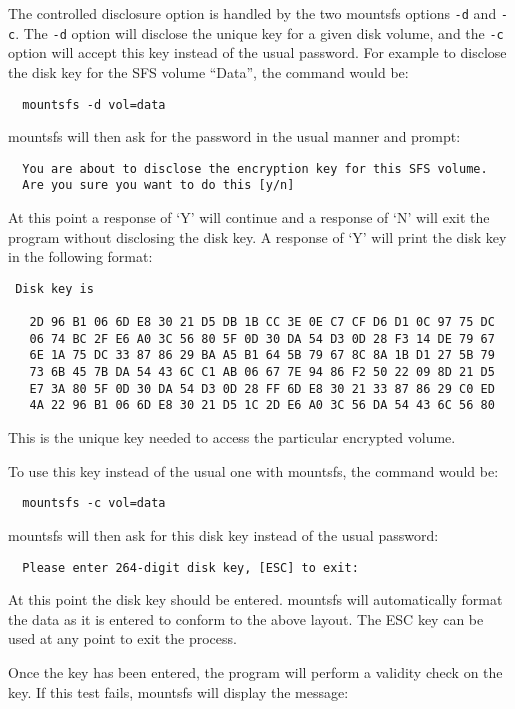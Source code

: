 The controlled disclosure option is handled by the two mountsfs options {\tt -d}
and {\tt -c}.  The {\tt -d} option will disclose the unique key for a given disk
volume, and the {\tt -c} option will accept this key instead of the usual password.
For example to disclose the disk key for the SFS volume ``Data'', the command
would be:

{\tt \verb|  |mountsfs -d vol=data}

mountsfs will then ask for the password in the usual manner and prompt:

\begin{verbatim}
  You are about to disclose the encryption key for this SFS volume.
  Are you sure you want to do this [y/n]
\end{verbatim}

At this point a response of `Y' will continue and a response of `N' will exit
the program without disclosing the disk key.  A response of `Y' will print the
disk key in the following format:

\begin{verbatim}
 Disk key is

   2D 96 B1 06 6D E8 30 21 D5 DB 1B CC 3E 0E C7 CF D6 D1 0C 97 75 DC
   06 74 BC 2F E6 A0 3C 56 80 5F 0D 30 DA 54 D3 0D 28 F3 14 DE 79 67
   6E 1A 75 DC 33 87 86 29 BA A5 B1 64 5B 79 67 8C 8A 1B D1 27 5B 79
   73 6B 45 7B DA 54 43 6C C1 AB 06 67 7E 94 86 F2 50 22 09 8D 21 D5
   E7 3A 80 5F 0D 30 DA 54 D3 0D 28 FF 6D E8 30 21 33 87 86 29 C0 ED
   4A 22 96 B1 06 6D E8 30 21 D5 1C 2D E6 A0 3C 56 DA 54 43 6C 56 80
\end{verbatim}

This is the unique key needed to access the particular encrypted volume.

To use this key instead of the usual one with mountsfs, the command would be:

{\tt \verb|  |mountsfs -c vol=data}

mountsfs will then ask for this disk key instead of the usual password:

{\tt \verb|  |Please enter 264-digit disk key, [ESC] to exit:}

At this point the disk key should be entered.  mountsfs will automatically
format the data as it is entered to conform to the above layout.  The ESC key
can be used at any point to exit the process.

Once the key has been entered, the program will perform a validity check on the
key.  If this test fails, mountsfs will display the message:

